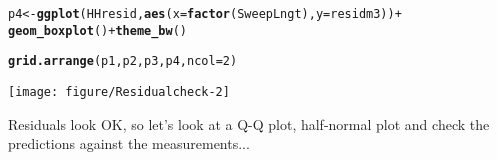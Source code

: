 \documentclass[12pt]{article}\usepackage[]{graphicx}\usepackage[]{color}
\makeatletter
\def\maxwidth{ %
  \ifdim\Gin@nat@width>\linewidth
    \linewidth
  \else
    \Gin@nat@width
  \fi
}
\newcommand{\hlnum}[1]{\textcolor[rgb]{0.686,0.059,0.569}{#1}}%
\newcommand{\hlopt}[1]{\textcolor[rgb]{0,0,0}{#1}}%
\newcommand{\hlstd}[1]{\textcolor[rgb]{0.345,0.345,0.345}{#1}}%
\newcommand{\hlkwb}[1]{\textcolor[rgb]{0.69,0.353,0.396}{#1}}%
\newcommand{\hlkwc}[1]{\textcolor[rgb]{0.333,0.667,0.333}{#1}}%
\newcommand{\hlkwd}[1]{\textcolor[rgb]{0.737,0.353,0.396}{\textbf{#1}}}%
\newenvironment{kframe}{%
 \def\at@end@of@kframe{}%
 \ifinner\ifhmode%
  \def\at@end@of@kframe{\end{minipage}}%
  \begin{minipage}{\columnwidth}%
 \fi\fi%
 \def\FrameCommand##1{\hskip\@totalleftmargin \hskip-\fboxsep
 \colorbox{shadecolor}{##1}\hskip-\fboxsep
     \hskip-\linewidth \hskip-\@totalleftmargin \hskip\columnwidth}%
 \MakeFramed {\advance\hsize-\width
   \@totalleftmargin\z@ \linewidth\hsize
   \@setminipage}}%
 {\par\unskip\endMakeFramed%
 \at@end@of@kframe}
\newenvironment{knitrout}{}{} %
\makeatother
\begin{document}
\begin{knitrout}
\begin{kframe}
\begin{alltt}
\hlstd{p4} \hlkwb{<-} \hlkwd{ggplot}\hlstd{(HHresid,} \hlkwd{aes}\hlstd{(}\hlkwc{x} \hlstd{=} \hlkwd{factor}\hlstd{(SweepLngt),} \hlkwc{y} \hlstd{= residm3))} \hlopt{+}
    \hlkwd{geom_boxplot}\hlstd{()} \hlopt{+} \hlkwd{theme_bw}\hlstd{()}

\hlkwd{grid.arrange}\hlstd{(p1, p2, p3, p4,} \hlkwc{ncol} \hlstd{=} \hlnum{2}\hlstd{)}
\end{alltt}
\end{kframe}

{\centering \texttt{[image: figure/Residualcheck-2]} 

}



\end{knitrout}

Residuals look OK, so let's look at a Q-Q plot, half-normal plot and check the
predictions against the measurements...
\end{document}
